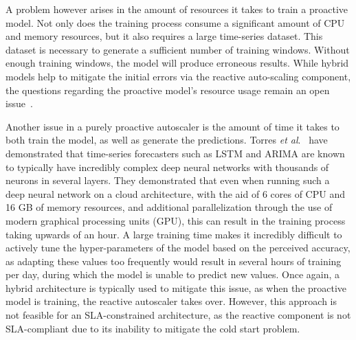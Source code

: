 A problem however arises in the amount of resources it takes to train a proactive model. Not only does the training process consume a significant amount of CPU and memory resources, but it also requires a large time-series dataset. This dataset is necessary to generate a sufficient number of training windows. Without enough training windows, the model will produce erroneous results. While hybrid models help to mitigate the initial errors via the reactive auto-scaling component, the questions regarding the proactive model's resource usage remain an open issue~\cite{radhika2021review}.\par


Another issue in a purely proactive autoscaler is the amount of time it takes to both train the model, as well as generate the predictions. Torres \textit{et al}.~\cite{torres2021deep} have demonstrated that time-series forecasters such as LSTM and ARIMA are known to typically have incredibly complex deep neural networks with thousands of neurons in several layers. They demonstrated that even when running such a deep neural network on a cloud architecture, with the aid of 6 cores of CPU and 16 GB of memory resources, and additional parallelization through the use of modern graphical processing units (GPU), this can result in the training process taking upwards of an hour. A large training time makes it incredibly difficult to actively tune the hyper-parameters of the model based on the perceived accuracy, as adapting these values too frequently would result in several hours of training per day, during which the model is unable to predict new values. Once again, a hybrid architecture is typically used to mitigate this issue, as when the proactive model is training, the reactive autoscaler takes over. However, this approach is not feasible for an SLA-constrained architecture, as the reactive component is not SLA-compliant due to its inability to mitigate the cold start problem.\par



